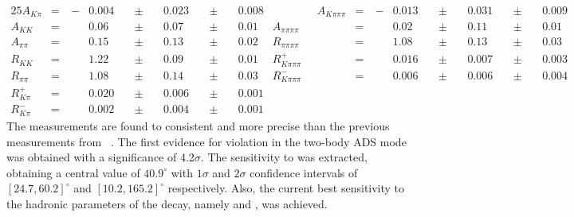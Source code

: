 \begin{alignat*}{25}
A_{K\pi} &= &\ -&0.004&\ &\pm&\ &0.023&\ &\pm&\ &0.008& \qquad\qquad
A_{K\pi\pi\pi} &= &\ -&0.013&\ &\pm&\ &0.031&\ &\pm&\ &0.009& \\
A_{KK} &= &&0.06&\ &\pm&\ &0.07&\ &\pm&\ &0.01& 
A_{\pi\pi\pi\pi} &= &&0.02&\ &\pm&\ &0.11&\ &\pm&\ &0.01& \\
A_{\pi\pi} &= &&0.15&\ &\pm&\ &0.13&\ &\pm&\ &0.02& 
R_{\pi\pi\pi\pi} &= &&1.08&\ &\pm&\ &0.13&\ &\pm&\ &0.03& \\
R_{KK} &= &&1.22&\ &\pm&\ &0.09&\ &\pm&\ &0.01& 
R^+_{K\pi\pi\pi} &= &&0.016&\ &\pm&\ &0.007&\ &\pm&\ &0.003& \\
R_{\pi\pi} &= &&1.08&\ &\pm&\ &0.14&\ &\pm&\ &0.03& 
R^-_{K\pi\pi\pi} &= &&0.006&\ &\pm&\ &0.006&\ &\pm&\ &0.004& \\
R^+_{K\pi} &= &&0.020&\ &\pm&\ &0.006&\ &\pm&\ &0.001& &&&&&&&&&&&&\\ 
R^-_{K\pi} &= &&0.002&\ &\pm&\ &0.004&\ &\pm&\ &0.001& &&&&&&&&&&&&
\end{alignat*} 
The measurements are found to consistent and more precise than the previous measurements from \babar~\cite{BaBarDKstar}. The first evidence for \CP violation in the two-body ADS mode was obtained with a significance of 4.2$\sigma$. The sensitivity to \Pgamma was extracted, obtaining a central value of $40.9^{\circ}$ with $1\sigma$ and $2\sigma$ confidence intervals of $[24.7, 60.2]^{\circ}$ and $[10.2, 165.2]^{\circ}$ respectively. Also, the current best sensitivity to the hadronic parameters of the \Bm decay, namely \rb and \deltab, was achieved.

